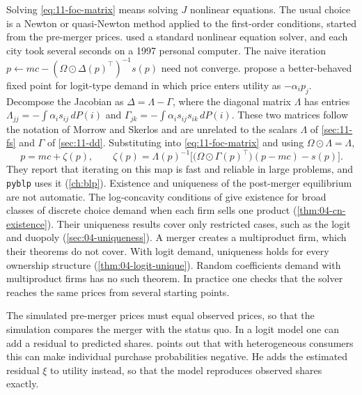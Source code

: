  Solving \eqref{eq:11-foc-matrix} means solving $J$ nonlinear equations. The usual choice is a
Newton or quasi-Newton method applied to the first-order conditions, started from the pre-merger prices.
\citet[fn.~13]{Nevo2000b} used a standard nonlinear equation solver, and each city took several seconds on a 1997
personal computer. The naive iteration $p \leftarrow mc - (\Omega \odot \Delta(p)^\top)^{-1}s(p)$ need not converge.
\citet{MorrowSkerlos2011} propose a better-behaved fixed point for logit-type demand in which price enters utility as
$-\alpha_i p_j$. Decompose the Jacobian as $\Delta = \Lambda - \Gamma$, where the diagonal matrix $\Lambda$ has entries
$\Lambda_{jj} = -\int \alpha_i s_{ij}\,dP(i)$ and $\Gamma_{jk} = -\int \alpha_i s_{ij}s_{ik}\,dP(i)$. These two matrices
follow the notation of Morrow and Skerlos and are unrelated to the scalars $\Lambda$ of \cref{sec:11-fs} and $\Gamma$
of \cref{sec:11-dd}. Substituting into \eqref{eq:11-foc-matrix} and using $\Omega \odot \Lambda = \Lambda$,
\begin{equation}\label{eq:11-zeta}
  p = mc + \zeta(p) , \qquad \zeta(p) = \Lambda(p)^{-1}\big[\big(\Omega \odot \Gamma(p)^\top\big)(p - mc) - s(p)\big] .
\end{equation}
They report that iterating on this map is fast and reliable in large problems, and \texttt{pyblp} uses it
(\cref{ch:blp}). Existence and uniqueness of the post-merger equilibrium are not automatic. The log-concavity
conditions of \citet{CaplinNalebuff1991} give existence for broad classes of discrete choice demand when each firm
sells one product (\cref{thm:04-cn-existence}). Their uniqueness results cover only restricted cases, such as the
logit and duopoly (\cref{sec:04-uniqueness}). A merger creates a multiproduct firm, which their theorems do not cover.
With logit demand, uniqueness holds for every ownership structure (\cref{thm:04-logit-unique}). Random coefficients
demand with multiproduct firms has no such theorem. In practice one checks that the solver reaches the same prices
from several starting points.

 The simulated pre-merger prices must equal observed prices, so that the simulation compares the
merger with the status quo. In a logit model one can add a residual to predicted shares. \citet[p.~31]{Nevo2000b}
points out that with heterogeneous consumers this can make individual purchase probabilities negative. He adds the
estimated residual $\xi$ to utility instead, so that the model reproduces observed shares exactly.

